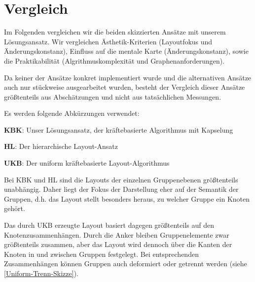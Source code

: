 \section{Vergleich} 
\label{Ansatz-Vergleich}
Im Folgenden vergleichen wir die beiden skizzierten Ansätze mit unserem Lösungsansatz. Wir vergleichen Ästhetik-Kriterien (Layoutfokus und Änderungskonstanz), Einfluss auf die mentale Karte (Änderungskonstanz), sowie die Praktikabilität (Algrithmuskomplexität und Graphenanforderungen).

Da keiner der Ansätze konkret implementiert wurde und die alternativen Ansätze auch nur stückweise ausgearbeitet wurden, besteht der Vergleich dieser Ansätze größtenteils aus Abschätzungen und nicht aus tatsächlichen Messungen.


Es werden folgende Abkürzungen verwendet:

\textbf{KBK}: Unser Lösungsansatz, der kräftebasierte Algorithmus mit Kapselung

\textbf{HL}: Der hierarchische Layout-Ansatz

\textbf{UKB}: Der uniform kräftebasierte Layout-Algorithmus

Bei KBK und HL sind die Layouts der einzelnen Gruppenebenen größtenteils unabhängig. Daher liegt der Fokus der Darstellung eher auf der Semantik der Gruppen, d.h. das Layout stellt besonders heraus, zu welcher Gruppe ein Knoten gehört.

Das durch UKB erzeugte Layout basiert dagegen größtenteils auf den Knotenzusammenhängen. Durch die Anker bleiben Gruppenelemente zwar größtenteils zusammen, aber das Layout wird dennoch über die Kanten der Knoten in und zwischen Gruppen festgelegt. Bei entsprechenden Zusammenhängen können Gruppen auch deformiert oder getrennt werden (siehe \autoref{Uniform-Trenn-Skizze}).

